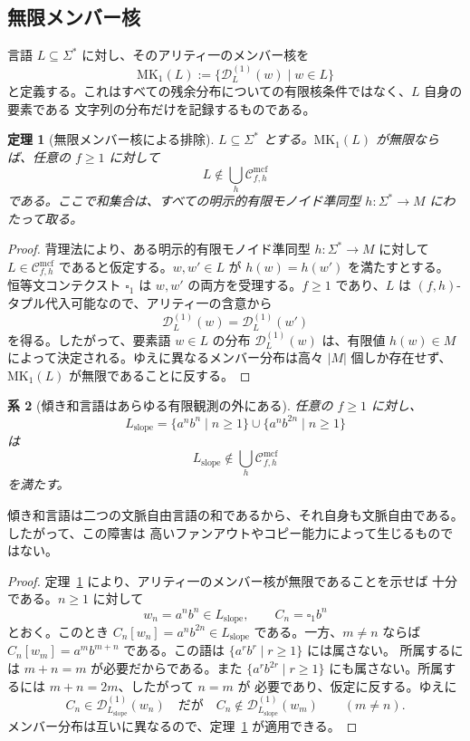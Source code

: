\documentclass[11pt,a4paper]{ltjsarticle}
\newtheorem{theorem}{定理}[section]
\newtheorem{corollary}[theorem]{系}
\theoremstyle{remark}
\newcommand{\Cmcf}[2]{\mathcal{C}^{\mathrm{mcf}}_{#1,#2}}
\newcommand{\D}{\mathcal{D}}
\newcommand{\blank}{\square}
\begin{document}
\subsection{無限メンバー核}
\label{subsec:member-kernel-exclusion}

言語 \(L\subseteq\Sigma^*\) に対し、そのアリティ一のメンバー核を
\[
  \mathrm{MK}_1(L):=\{\D_L^{(1)}(w)\mid w\in L\}
\]
と定義する。これはすべての残余分布についての有限核条件ではなく、\(L\) 自身の要素である
文字列の分布だけを記録するものである。

\begin{theorem}[無限メンバー核による排除]
\label{thm:member-kernel-exclusion}
\(L\subseteq\Sigma^*\) とする。\(\mathrm{MK}_1(L)\) が無限ならば、任意の \(f\ge1\) に対して
\[
  L\notin \bigcup_h \Cmcf{f}{h}
\]
である。ここで和集合は、すべての明示的有限モノイド準同型
\(h:\Sigma^*\to M\) にわたって取る。
\end{theorem}

\begin{proof}
背理法により、ある明示的有限モノイド準同型 \(h:\Sigma^*\to M\) に対して
\(L\in\Cmcf{f}{h}\) であると仮定する。\(w,w'\in L\) が \(h(w)=h(w')\) を満たすとする。
恒等文コンテクスト \(\blank_1\) は \(w,w'\) の両方を受理する。\(f\ge1\) であり、\(L\) は
\((f,h)\)-タプル代入可能なので、アリティ一の含意から
\[
  \D_L^{(1)}(w)=\D_L^{(1)}(w')
\]
を得る。したがって、要素語 \(w\in L\) の分布 \(\D_L^{(1)}(w)\) は、有限値
\(h(w)\in M\) によって決定される。ゆえに異なるメンバー分布は高々 \(|M|\) 個しか存在せず、
\(\mathrm{MK}_1(L)\) が無限であることに反する。
\end{proof}

\begin{corollary}[傾き和言語はあらゆる有限観測の外にある]
\label{cor:slope-union-outside-every-finite-observation}
任意の \(f\ge1\) に対し、
\[
  L_{\mathrm{slope}}
  =
  \{a^n b^n\mid n\ge1\}
  \cup
  \{a^n b^{2n}\mid n\ge1\}
\]
は
\[
  L_{\mathrm{slope}}\notin \bigcup_h \Cmcf{f}{h}
\]
を満たす。
\end{corollary}

傾き和言語は二つの文脈自由言語の和であるから、それ自身も文脈自由である。したがって、この障害は
高いファンアウトやコピー能力によって生じるものではない。

\begin{proof}
定理~\ref{thm:member-kernel-exclusion} により、アリティ一のメンバー核が無限であることを示せば
十分である。\(n\ge1\) に対して
\[
  w_n=a^n b^n\in L_{\mathrm{slope}},
  \qquad
  C_n=\blank_1 b^n
\]
とおく。このとき \(C_n[w_n]=a^n b^{2n}\in L_{\mathrm{slope}}\) である。一方、\(m\ne n\) ならば
\(C_n[w_m]=a^m b^{m+n}\) である。この語は \(\{a^r b^r\mid r\ge1\}\) には属さない。
所属するには \(m+n=m\) が必要だからである。また
\(\{a^r b^{2r}\mid r\ge1\}\) にも属さない。所属するには \(m+n=2m\)、したがって \(n=m\) が
必要であり、仮定に反する。ゆえに
\[
  C_n\in\D_{L_{\mathrm{slope}}}^{(1)}(w_n)
  \quad\text{だが}\quad
  C_n\notin\D_{L_{\mathrm{slope}}}^{(1)}(w_m)
  \qquad(m\ne n).
\]
メンバー分布は互いに異なるので、定理~\ref{thm:member-kernel-exclusion} が適用できる。
\end{proof}
\end{document}
